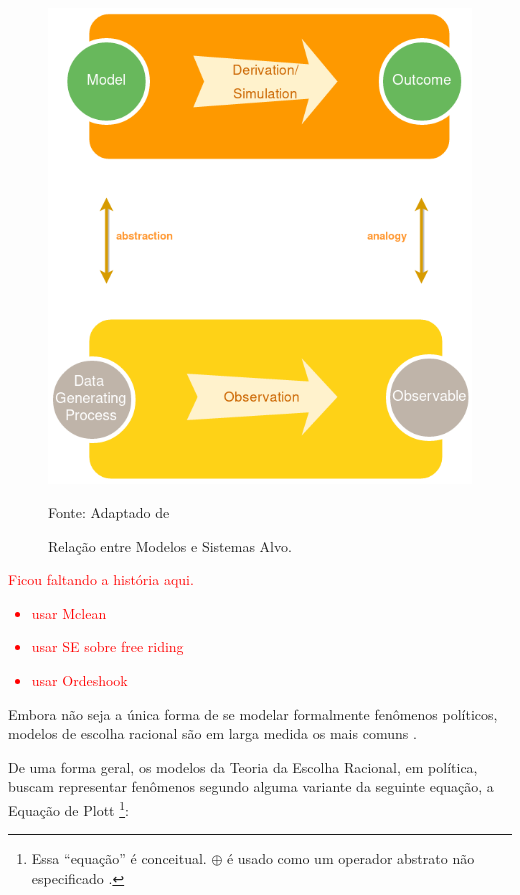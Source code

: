 \begin{figure}[H]
  \centering \includegraphics[scale = 0.5]{ims/ms.png}
  \caption{Relação entre Modelos e Sistemas Alvo.}
  Fonte: Adaptado de 
\end{figure}


\textcolor{red}{Ficou faltando a história aqui.
  \begin{itemize}
  \item usar Mclean
  \item usar SE sobre free riding
  \item usar Ordeshook
  \end{itemize}
}


Embora não seja a única forma de se modelar formalmente fenômenos políticos,
modelos de escolha racional são em larga medida os mais comuns
\cite{austen1998social}.

De uma forma geral, os modelos da Teoria da Escolha Racional, em política,
buscam representar fenômenos segundo alguma variante da seguinte equação, a
Equação de Plott \cite{munger2015choosing, ostrom1986agenda}\footnote{Essa
  ``equação'' é conceitual. \(\oplus\) é usado como um operador abstrato não
  especificado \cite{ostrom1986agenda}. }:

